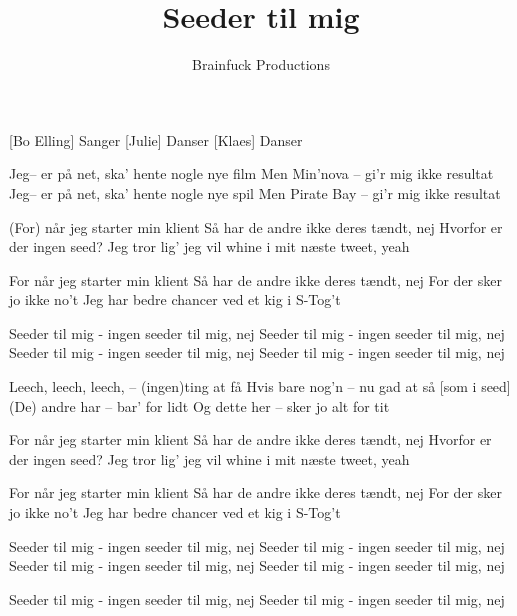 \documentclass[a4paper,11pt]{article}
\title{Seeder til mig}
\author{Brainfuck Productions}
\begin{document}
\maketitle

\begin{roles}  
[Bo Elling] Sanger
[Julie] Danser
[Klaes] Danser
\end{roles}

\begin{song}
 Jeg-- er på net, ska' hente nogle nye film
  Men Min'nova -- gi'r mig ikke resultat
  Jeg-- er på net, ska' hente nogle nye spil
  Men Pirate Bay -- gi'r mig ikke resultat

 (For) når jeg starter min klient
  Så har de andre ikke deres tændt, nej
  Hvorfor er der ingen seed?
  Jeg tror lig' jeg vil whine i mit næste tweet, yeah

 For når jeg starter min klient
  Så har de andre ikke deres tændt, nej
  For der sker jo ikke no't
  Jeg har bedre chancer ved et kig i S-Tog't 

 Seeder til mig - ingen seeder til mig, nej
  Seeder til mig - ingen seeder til mig, nej
  Seeder til mig - ingen seeder til mig, nej
  Seeder til mig - ingen seeder til mig, nej

 Leech, leech, leech, -- (ingen)ting at få
  Hvis bare nog'n -- nu gad at så [som i seed]
  (De) andre har -- bar' for lidt
  Og dette her -- sker jo alt for tit

 For når jeg starter min klient
  Så har de andre ikke deres tændt, nej
  Hvorfor er der ingen seed?
  Jeg tror lig' jeg vil whine i mit næste tweet, yeah

 For når jeg starter min klient
  Så har de andre ikke deres tændt, nej
  For der sker jo ikke no't
  Jeg har bedre chancer ved et kig i S-Tog't

 Seeder til mig - ingen seeder til mig, nej
  Seeder til mig - ingen seeder til mig, nej
  Seeder til mig - ingen seeder til mig, nej
  Seeder til mig - ingen seeder til mig, nej

 Seeder til mig - ingen seeder til mig, nej
  Seeder til mig - ingen seeder til mig, nej

\end{song}
\end{document}
